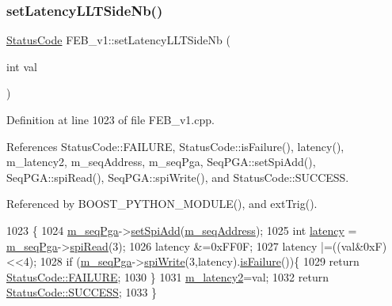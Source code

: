 \subsubsection{\texorpdfstring{set\+Latency\+L\+L\+T\+Side\+Nb()}{setLatencyLLTSideNb()}}
{\footnotesize\ttfamily \hyperlink{classStatusCode}{Status\+Code} F\+E\+B\+\_\+v1\+::set\+Latency\+L\+L\+T\+Side\+Nb (\begin{DoxyParamCaption}\item[{int}]{val }\end{DoxyParamCaption})}



Definition at line 1023 of file F\+E\+B\+\_\+v1.\+cpp.



References Status\+Code\+::\+F\+A\+I\+L\+U\+RE, Status\+Code\+::is\+Failure(), latency(), m\+\_\+latency2, m\+\_\+seq\+Address, m\+\_\+seq\+Pga, Seq\+P\+G\+A\+::set\+Spi\+Add(), Seq\+P\+G\+A\+::spi\+Read(), Seq\+P\+G\+A\+::spi\+Write(), and Status\+Code\+::\+S\+U\+C\+C\+E\+SS.



Referenced by B\+O\+O\+S\+T\+\_\+\+P\+Y\+T\+H\+O\+N\+\_\+\+M\+O\+D\+U\+L\+E(), and ext\+Trig().


\begin{DoxyCode}
1023                                              \{
1024   \hyperlink{classFEB__v1_a6c7804ac86796f233a8393043adf2e77}{m\_seqPga}->\hyperlink{classSeqPGA_ac998ce3a6d9b5f2e88cc8393f8c1df53}{setSpiAdd}(\hyperlink{classFEB__v1_a1c1eb093fd1733b9510fcf8bc5c7ad08}{m\_seqAddress});
1025   \textcolor{keywordtype}{int} \hyperlink{classFEB__v1_a68050d232efd8d6568910b09a2c18f62}{latency} = \hyperlink{classFEB__v1_a6c7804ac86796f233a8393043adf2e77}{m\_seqPga}->\hyperlink{classSeqPGA_ab3d0e5e5d4014bc7a92588a76b8713d4}{spiRead}(3);
1026   latency &=0xFF0F;
1027   latency |=((val&0xF)<<4);
1028    \textcolor{keywordflow}{if} (\hyperlink{classFEB__v1_a6c7804ac86796f233a8393043adf2e77}{m\_seqPga}->\hyperlink{classSeqPGA_ad4421841ce4ce8b88ad13f63216f0743}{spiWrite}(3,latency).\hyperlink{classStatusCode_a5dd22dc6eb2c52fc4cabc58f6dea2eb7}{isFailure}())\{
1029     \textcolor{keywordflow}{return} \hyperlink{classStatusCode_a6f565cbeadc76d14c72f047e5e85eb4ba3da73d4c469762eb9d3c960368252b26}{StatusCode::FAILURE};
1030   \}
1031    \hyperlink{classFEB__v1_a2c4b18efd76de3bf7089bba57fb6744f}{m\_latency2}=val;
1032   \textcolor{keywordflow}{return} \hyperlink{classStatusCode_a6f565cbeadc76d14c72f047e5e85eb4badd0da38d3ba0d922efd1f4619bc37ad8}{StatusCode::SUCCESS};   
1033 \}
\end{DoxyCode}
\mbox{\label{classFEB__v1_a8a3aafdda0f1028e02c4a5850f987f32}} 
